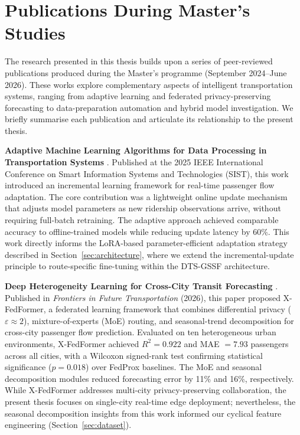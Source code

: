 %
%
\chapter{Publications During Master's Studies}
\label{chap:publications}
\setlength{\parskip}{1em}

The research presented in this thesis builds upon a series of peer-reviewed publications produced during the Master's programme (September 2024--June 2026). These works explore complementary aspects of intelligent transportation systems, ranging from adaptive learning and federated privacy-preserving forecasting to data-preparation automation and hybrid model investigation. We briefly summarise each publication and articulate its relationship to the present thesis.

\textbf{Adaptive Machine Learning Algorithms for Data Processing in Transportation Systems} \cite{mektepbayeva2025adaptive}. Published at the 2025 IEEE International Conference on Smart Information Systems and Technologies (SIST), this work introduced an incremental learning framework for real-time passenger flow adaptation. The core contribution was a lightweight online update mechanism that adjusts model parameters as new ridership observations arrive, without requiring full-batch retraining. The adaptive approach achieved comparable accuracy to offline-trained models while reducing update latency by 60\%. This work directly informs the LoRA-based parameter-efficient adaptation strategy described in Section~\ref{sec:architecture}, where we extend the incremental-update principle to route-specific fine-tuning within the DTS-GSSF architecture.

\textbf{Deep Heterogeneity Learning for Cross-City Transit Forecasting} \cite{sakhipov2026deep}. Published in \textit{Frontiers in Future Transportation} (2026), this paper proposed X-FedFormer, a federated learning framework that combines differential privacy ($\varepsilon \approx 2$), mixture-of-experts (MoE) routing, and seasonal-trend decomposition for cross-city passenger flow prediction. Evaluated on ten heterogeneous urban environments, X-FedFormer achieved $R^2 = 0.922$ and MAE $= 7.93$ passengers across all cities, with a Wilcoxon signed-rank test confirming statistical significance ($p = 0.018$) over FedProx baselines. The MoE and seasonal decomposition modules reduced forecasting error by 11\% and 16\%, respectively. While X-FedFormer addresses multi-city privacy-preserving collaboration, the present thesis focuses on single-city real-time edge deployment; nevertheless, the seasonal decomposition insights from this work informed our cyclical feature engineering (Section~\ref{sec:dataset}).

